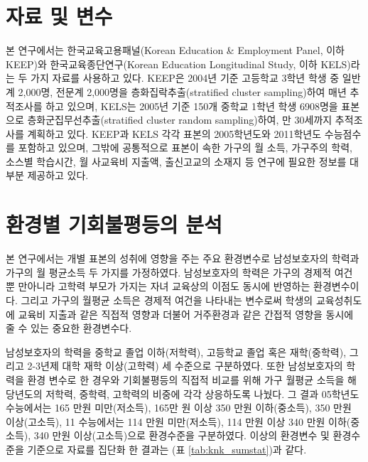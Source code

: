 \section{자료 및 변수}

본 연구에서는 한국교육고용패널(Korean Education \& Employment Panel, 이하 KEEP)와 한국교육종단연구(Korean Education Longitudinal Study, 이하 KELS)라는 두 가지 자료를 사용하고 있다.
KEEP은 2004년 기준 고등학교 3학년 학생 중 일반계 2,000명, 전문계 2,000명을 층화집락추출(stratified cluster sampling)하여 매년 추적조사를 하고 있으며, KELS는 2005년 기준 150개 중학교 1학년 학생 6908명을 표본으로 층화군집무선추출(stratified cluster random sampling)하여, 만 30세까지 추적조사를 계획하고 있다.
 KEEP과 KELS 각각 표본의 2005학년도와 2011학년도 수능점수를 포함하고 있으며, 그밖에 공통적으로 표본이 속한 가구의 월 소득, 가구주의 학력, 소스별 학습시간, 월 사교육비 지출액, 출신고교의 소재지 등 연구에 필요한 정보를 대부분 제공하고 있다. 

\section{환경별 기회불평등의 분석}

본 연구에서는 개별 표본의 성취에 영향을 주는 주요 환경변수로 남성보호자의 학력과 가구의 월 평균소득 두 가지를 가정하였다.
남성보호자의 학력은 가구의 경제적 여건 뿐 만아니라 고학력 부모가 가지는 자녀 교육상의 이점도 동시에 반영하는 환경변수이다.
 그리고 가구의 월평균 소득은 경제적 여건을 나타내는 변수로써 학생의 교육성취도에 교육비 지출과 같은 직접적 영향과 더불어 거주환경과 같은 간접적 영향을 동시에 줄 수 있는 중요한 환경변수다. 
 

남성보호자의 학력을 중학교 졸업 이하(저학력), 고등학교 졸업 혹은 재학(중학력), 그리고 2-3년제 대학 재학 이상(고학력) 세 수준으로 구분하였다.
또한 남성보호자의 학력을 환경 변수로 한 경우와 기회불평등의 직접적 비교를 위해 가구 월평균 소득을 해당년도의 저학력, 중학력, 고학력의 비중에 각각 상응하도록 나눴다.
 그 결과 05학년도 수능에서는 165 만원 미만(저소득), 165만 원 이상 350 만원 이하(중소득), 350 만원 이상(고소득), 11 수능에서는 114 만원 미만(저소득), 114 만원 이상 340 만원 이하(중소득), 340 만원 이상(고소득)으로 환경수준을 구분하였다.
 이상의 환경변수 및 환경수준을 기준으로 자료를 집단화 한 결과는 (표 \ref{tab:knk_sumstat})과 같다.

